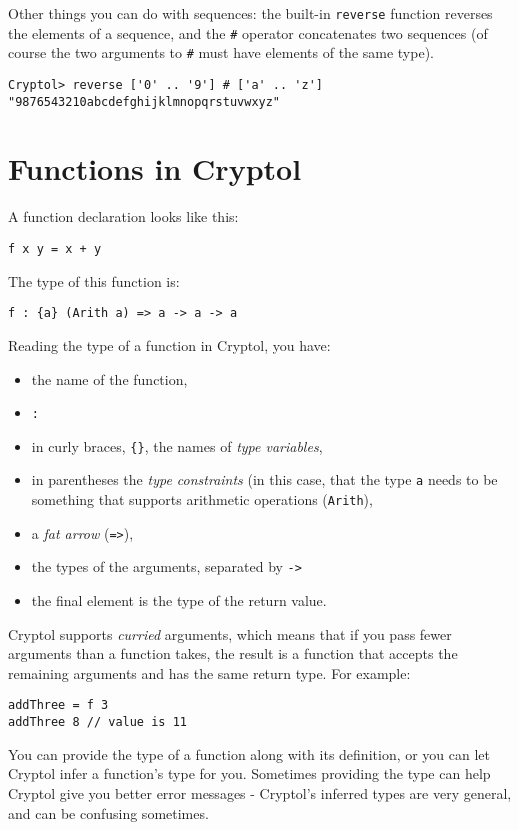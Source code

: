 \documentclass[9pt,letter]{article}
\begin{document}
Other things you can do with sequences: the built-in \verb+reverse+
function reverses the elements of a sequence, and the \verb+#+
operator concatenates two sequences (of course the two arguments to
\verb+#+ must have elements of the same type).
\begin{verbatim}
Cryptol> reverse ['0' .. '9'] # ['a' .. 'z']
"9876543210abcdefghijklmnopqrstuvwxyz"
\end{verbatim}

\section{Functions in Cryptol}
A function declaration looks like this:
\begin{verbatim}
f x y = x + y
\end{verbatim}
The type of this function is:
\begin{verbatim}
f : {a} (Arith a) => a -> a -> a
\end{verbatim}
Reading the type of a function in Cryptol, you have:
\begin{itemize}
\item{the name of the function, }
\item{\verb+:+}
\item{in curly braces, \verb+{}+, the names of {\em type variables}, }
\item{in parentheses the {\em type constraints} (in this case, that the type \verb+a+ needs to be something that supports arithmetic operations (\verb+Arith+),}
\item{a {\em fat arrow} (\verb+=>+),}
\item{the types of the arguments, separated by \verb+->+}
\item{the final element is the type of the return value.}
\end{itemize}

Cryptol supports {\em curried} arguments, which means that if you pass
fewer arguments than a function takes, the result is a function that
accepts the remaining arguments and has the same return type. For
example:
\begin{verbatim}
addThree = f 3
addThree 8 // value is 11
\end{verbatim}

You can provide the type of a function along with its definition, or
you can let Cryptol infer a function's type for you. Sometimes
providing the type can help Cryptol give you better error messages -
Cryptol's inferred types are very general, and can be confusing
sometimes.
\end{document}
